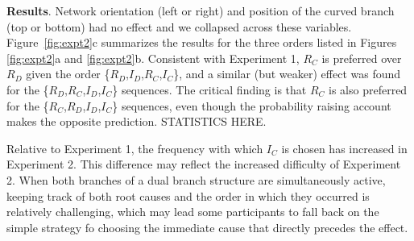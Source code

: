 \documentclass[10pt,letterpaper]{article}
\newcommand{\ev}[2]{$#1_#2$}
\begin{document}



\textbf{Results}.  Network orientation (left or right) and position of the curved branch (top or bottom) had no effect and we collapsed across these variables.  Figure~\ref{fig:expt2}c summarizes the results for the three orders listed in Figures \ref{fig:expt2}a and \ref{fig:expt2}b. Consistent with Experiment 1,  \ev{R}{C} is preferred over \ev{R}{D} given the order \{\ev{R}{D},\ev{I}{D},\ev{R}{C},\ev{I}{C}\}, and a similar (but weaker) effect was found for the \{\ev{R}{D},\ev{R}{C},\ev{I}{D},\ev{I}{C}\} sequences. The critical finding is that \ev{R}{C} is also preferred for the \{\ev{R}{C},\ev{R}{D},\ev{I}{D},\ev{I}{C}\} sequences, even though the probability raising account makes the opposite prediction. STATISTICS HERE.

Relative to Experiment 1, the frequency with which \ev{I}{C} is chosen has increased in Experiment 2. This difference may reflect the increased difficulty of Experiment 2. When both branches of a dual branch structure are simultaneously active, keeping track of both root causes and the order in which they occurred is relatively challenging, which may lead some participants to fall back on the simple strategy fo choosing the immediate cause that directly precedes the effect.
\end{document}
